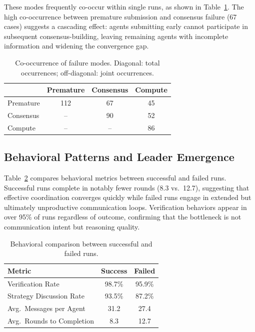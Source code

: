 These modes frequently co-occur within single runs, as shown in Table~\ref{tab:failure_cooccurrence}. The high co-occurrence between premature submission and consensus failure (67 cases) suggests a cascading effect: agents submitting early cannot participate in subsequent consensus-building, leaving remaining agents with incomplete information and widening the convergence gap.

\begin{table}[t]
\centering
\small
\renewcommand{\arraystretch}{1.1}
\begin{tabular}{lccc}
\toprule
& \textbf{Premature} & \textbf{Consensus} & \textbf{Compute} \\
\midrule
Premature & 112 & 67 & 45 \\
Consensus & -- & 90 & 52 \\
Compute & -- & -- & 86 \\
\bottomrule
\end{tabular}
\caption{Co-occurrence of failure modes. Diagonal: total occurrences; off-diagonal: joint occurrences.}
\label{tab:failure_cooccurrence}
\end{table}

\subsection{Behavioral Patterns and Leader Emergence}
\label{app:behavior_patterns}

Table~\ref{tab:behavior_patterns_full} compares behavioral metrics between successful and failed runs. Successful runs complete in notably fewer rounds (8.3 vs.\ 12.7), suggesting that effective coordination converges quickly while failed runs engage in extended but ultimately unproductive communication loops. Verification behaviors appear in over 95\% of runs regardless of outcome, confirming that the bottleneck is not communication intent but reasoning quality.

\begin{table}[t]
\centering
\small
\renewcommand{\arraystretch}{1.1}
\begin{tabular}{lcc}
\toprule
\textbf{Metric} & \textbf{Success} & \textbf{Failed} \\
\midrule
Verification Rate & 98.7\% & 95.9\% \\
Strategy Discussion Rate & 93.5\% & 87.2\% \\
Avg.\ Messages per Agent & 31.2 & 27.4 \\
Avg.\ Rounds to Completion & 8.3 & 12.7 \\
\bottomrule
\end{tabular}
\caption{Behavioral comparison between successful and failed runs.}
\label{tab:behavior_patterns_full}
\end{table}

